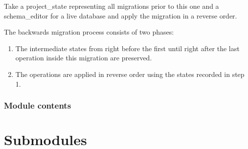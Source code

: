 \documentclass[letterpaper,10pt,english]{sphinxmanual}
\begin{document}
\begin{fulllineitems}
\begin{fulllineitems}
\end{fulllineitems}


\begin{fulllineitems}
\label{\detokenize{tasks.migrations:tasks.migrations.0002_alter_task_due_date.Migration.unapply}}
\pysigstartsignatures
{}
\pysigstopsignatures
\sphinxAtStartPar
Take a project\_state representing all migrations prior to this one
and a schema\_editor for a live database and apply the migration
in a reverse order.

\sphinxAtStartPar
The backwards migration process consists of two phases:
\begin{enumerate}
%
\item {} 
\sphinxAtStartPar
The intermediate states from right before the first until right
after the last operation inside this migration are preserved.

\item {} 
\sphinxAtStartPar
The operations are applied in reverse order using the states
recorded in step 1.

\end{enumerate}

\end{fulllineitems}


\end{fulllineitems}



\subsubsection{Module contents}
\label{\detokenize{tasks.migrations:module-tasks.migrations}}\label{\detokenize{tasks.migrations:module-contents}}

\section{Submodules}
\label{\detokenize{tasks:submodules}}
\end{document}
